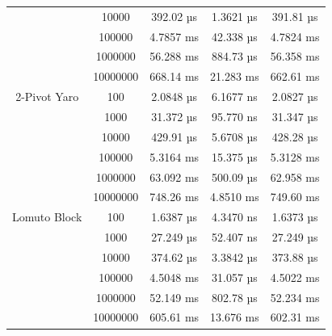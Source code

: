 \documentclass[a4paper,oneside,12pt]{book}
\begin{document}
\begin{center}
\begin{tabular}{ |c c | c c c| }
                        & 10000    & 392.02 µs    & 1.3621 µs   & 391.81 µs \\
                        & 100000   & 4.7857 ms    & 42.338 µs   & 4.7824 ms \\
                        & 1000000  & 56.288 ms    & 884.73 µs   & 56.358 ms \\
                        & 10000000 & 668.14 ms    & 21.283 ms   & 662.61 ms \\
        \hline
        2-Pivot Yaro    & 100      & 2.0848 µs    & 6.1677 ns   & 2.0827 µs \\
                        & 1000     & 31.372 µs    & 95.770 ns   & 31.347 µs \\
                        & 10000    & 429.91 µs    & 5.6708 µs   & 428.28 µs \\
                        & 100000   & 5.3164 ms    & 15.375 µs   & 5.3128 ms \\
                        & 1000000  & 63.092 ms    & 500.09 µs   & 62.958 ms \\
                        & 10000000 & 748.26 ms    & 4.8510 ms   & 749.60 ms \\
        Lomuto Block    & 100      & 1.6387 µs    & 4.3470 ns   & 1.6373 µs \\
                        & 1000     & 27.249 µs    & 52.407 ns   & 27.249 µs \\
                        & 10000    & 374.62 µs    & 3.3842 µs   & 373.88 µs \\
                        & 100000   & 4.5048 ms    & 31.057 µs   & 4.5022 ms \\
                        & 1000000  & 52.149 ms    & 802.78 µs   & 52.234 ms \\
                        & 10000000 & 605.61 ms    & 13.676 ms   & 602.31 ms \\
        \hline
    \end{tabular}


\end{center}
\end{document}
